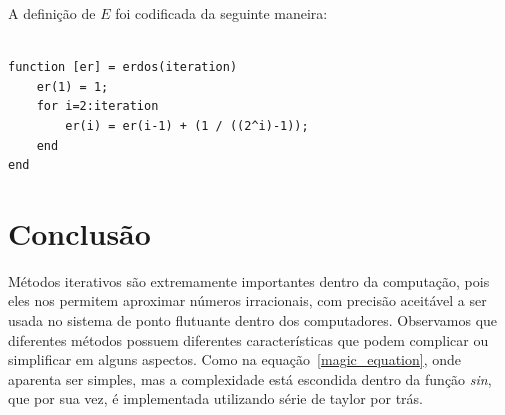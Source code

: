 \documentclass[a4paper]{article}
\begin{document}
A definição de $E$ foi codificada da seguinte maneira:

\begin{lstlisting}

function [er] = erdos(iteration)
	er(1) = 1;
	for i=2:iteration
		er(i) = er(i-1) + (1 / ((2^i)-1));
	end
end

\end{lstlisting}

\section{Conclusão}

Métodos iterativos são extremamente importantes dentro da computação, pois eles
nos permitem aproximar números irracionais, com precisão aceitável a ser usada
no sistema de ponto flutuante dentro dos computadores. Observamos que diferentes
métodos possuem diferentes características que podem complicar ou simplificar em
alguns aspectos. Como na equação~\ref{magic_equation}, onde aparenta ser
simples, mas a complexidade está escondida dentro da função \emph{sin}, que por
sua vez, é implementada utilizando série de taylor por trás.



\end{document}
